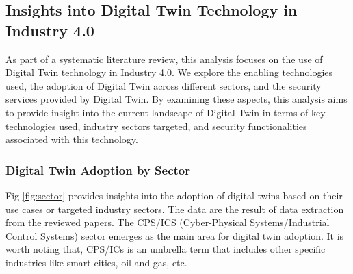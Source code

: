 \subsection{Insights into Digital Twin Technology in Industry 4.0}





As part of a systematic literature review, this analysis focuses on the use of Digital Twin technology in Industry 4.0. We explore the enabling technologies used, the adoption of Digital Twin across different sectors, and the security services provided by Digital Twin. By examining these aspects, this analysis aims to provide insight into the current landscape of Digital Twin in terms of key technologies used, industry sectors targeted, and security functionalities associated with this technology. 

\subsubsection*{Digital Twin Adoption by Sector}
Fig \ref{fig:sector} provides insights into the adoption of digital twins based on their use cases or targeted industry sectors. The data are the result of data extraction from the reviewed papers. The CPS/ICS (Cyber-Physical Systems/Industrial Control Systems) sector emerges as the main area for digital twin adoption. It is worth noting that, CPS/ICs is an umbrella term that includes other specific industries like smart cities, oil and gas, etc. 

